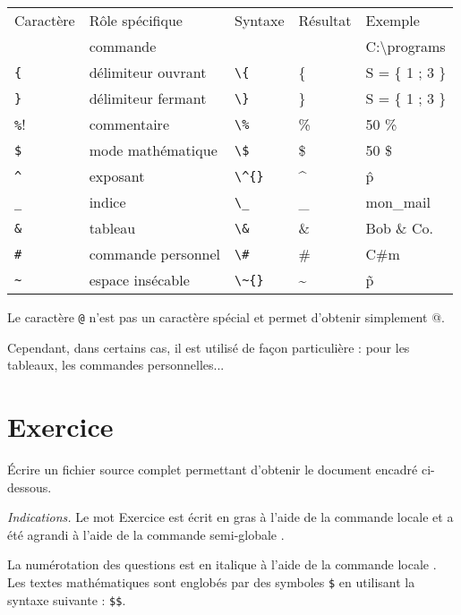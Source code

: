\begin{center}
	\begin{tabular}{lllll}
		\rowcolor{gray!50} Caractère & Rôle spécifique & Syntaxe & Résultat & Exemple \\
		{\tt \tbs} & commande & \NomCom{textbackslash} & \tbs & C:\textbackslash programs \\
		\verb!{! & délimiteur ouvrant & \verb:\{: & \{ & S = \{ 1 ; 3 \} \\
		\verb!}! & délimiteur fermant & \verb:\}: & \} & S = \{ 1 ; 3 \}\\
		\verb!%!
                    & commentaire & \verb!\%! & \% & 50 \% \\
		\verb!$! & mode mathématique & \verb!\$! & \$ & 50 \$ \\
		\verb!^! & exposant & \verb!\^{}! & \^{} & \^p \\
		\verb!_! & indice & \verb!\_! & \_ & mon\_mail \\
		\verb!&! & tableau & \verb!\&! & \& & Bob \& Co. \\
		\verb!#! & commande personnel & \verb!\#! & \# & C\#m \\
		\verb!~! & espace insécable & \verb!\~{}! & \~{} & \~p
	\end{tabular}
\end{center}

\begin{info}
	Le caractère \verb!@! n'est pas un caractère spécial et permet d'obtenir simplement {\normalfont @}.\par
	Cependant, dans certains cas, il est utilisé de façon particulière : pour les tableaux, les commandes personnelles...
\end{info}


\section{Exercice}

\'Ecrire un fichier source complet permettant d'obtenir le document encadré ci-dessous.\par
\textit{Indications.} Le mot {\sf Exercice} est écrit en gras à l'aide de la commande locale  et a été agrandi à l'aide de la commande semi-globale .\par
La numérotation des questions est en italique à l'aide de la commande locale . Les textes mathématiques sont englobés par des symboles \verb!$!  en utilisant la syntaxe suivante : \verb!$!\verb!$!.\bigskip

